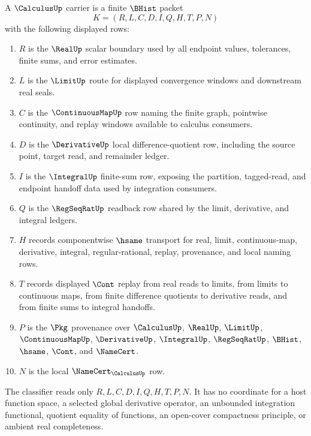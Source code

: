 \begin{definition}
\label{def:calculus-carrier}
A $\CalculusUp$ carrier is a finite $\BHist$ packet
$$
K=(R,L,C,D,I,Q,H,T,P,N)
$$
with the following displayed rows:
\begin{enumerate}
\item $R$ is the $\RealUp$ scalar boundary used by all endpoint values, tolerances, finite sums, and error estimates.
\item $L$ is the $\LimitUp$ route for displayed convergence windows and downstream real seals.
\item $C$ is the $\ContinuousMapUp$ row naming the finite graph, pointwise continuity, and replay windows available to calculus consumers.
\item $D$ is the $\DerivativeUp$ local difference-quotient row, including the source point, target read, and remainder ledger.
\item $I$ is the $\IntegralUp$ finite-sum row, exposing the partition, tagged-read, and endpoint handoff data used by integration consumers.
\item $Q$ is the $\RegSeqRatUp$ readback row shared by the limit, derivative, and integral ledgers.
\item $H$ records componentwise $\hsame$ transport for real, limit, continuous-map, derivative, integral, regular-rational, replay, provenance, and local naming rows.
\item $T$ records displayed $\Cont$ replay from real reads to limits, from limits to continuous maps, from finite difference quotients to derivative reads, and from finite sums to integral handoffs.
\item $P$ is the $\Pkg$ provenance over $\CalculusUp$, $\RealUp$, $\LimitUp$, $\ContinuousMapUp$, $\DerivativeUp$, $\IntegralUp$, $\RegSeqRatUp$, $\BHist$, $\hsame$, $\Cont$, and $\NameCert$.
\item $N$ is the local $\NameCert_{\CalculusUp}$ row.
\end{enumerate}
The classifier reads only $R,L,C,D,I,Q,H,T,P,N$. It has no coordinate for a host function space, a selected global derivative operator, an unbounded integration functional, quotient equality of functions, an open-cover compactness principle, or ambient real completeness.
\end{definition}

